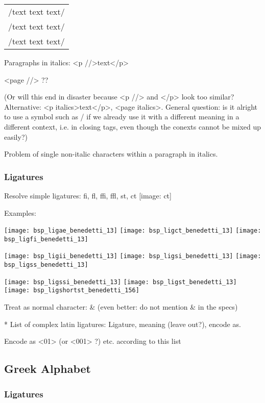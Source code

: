 \begin{tabular}{l}
/text text text/ \\
/text text text/ \\
/text text text/ \\
\end{tabular}

Paragraphs in italics: <p //>text</p> 
 
<page //> ??

(Or will this end in disaster because <p //> and </p> look too similar? Alternative: <p italics>text</p>, <page italics>. General question: is it alright to use a symbol such as / if we already use it with a different meaning in a different context, i.e. in closing tags, even though the conexts cannot be mixed up easily?)

Problem of single non-italic characters within a paragraph in italics.

\subsubsection{Ligatures}

Resolve simple ligatures: fi, fl, ffi, ffl, st, ct  [image: ct]

Examples:

\texttt{[image: bsp\_ligae\_benedetti\_13]}
\texttt{[image: bsp\_ligct\_benedetti\_13]}
\texttt{[image: bsp\_ligfi\_benedetti\_13]}

\texttt{[image: bsp\_ligii\_benedetti\_13]}
\texttt{[image: bsp\_ligsi\_benedetti\_13]}
\texttt{[image: bsp\_ligss\_benedetti\_13]}

\texttt{[image: bsp\_ligssi\_benedetti\_13]}
\texttt{[image: bsp\_ligst\_benedetti\_13]}
\texttt{[image: bsp\_ligshortst\_benedetti\_156]}

Treat as normal character: \& (even better: do not mention \& in the specs)

* List of complex latin ligatures: Ligature, meaning (leave out?), encode as.

Encode as <01> (or <001> ?) etc. according to this list

\subsection{Greek Alphabet}



\subsubsection{Ligatures}

